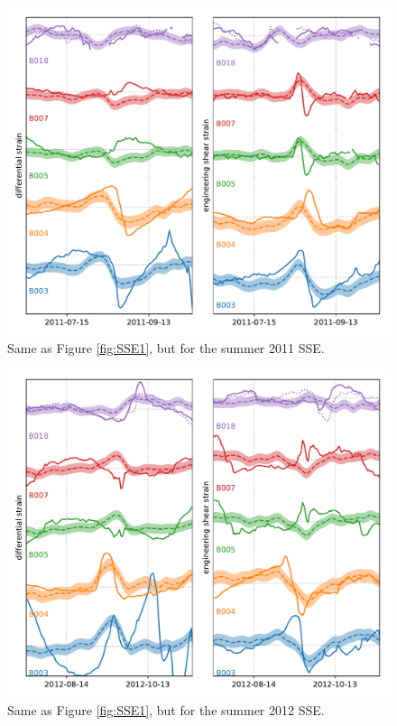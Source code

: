 \begin{figure}
\includegraphics{ch5/appendix_figures/SSE2.pdf}
\caption{Same as Figure \ref{fig:SSE1}, but for the summer 2011 SSE.}   
\label{fig:SSE2}
\end{figure}

\begin{figure}
\includegraphics{ch5/appendix_figures/SSE3.pdf}
\caption{Same as Figure \ref{fig:SSE1}, but for the summer 2012 SSE.}   
\label{fig:SSE3}
\end{figure}

